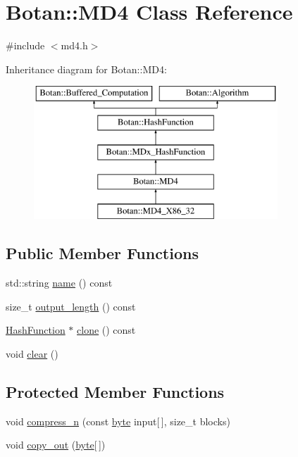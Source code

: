 \hypertarget{classBotan_1_1MD4}{\section{Botan\-:\-:M\-D4 Class Reference}
\label{classBotan_1_1MD4}
}


{\ttfamily \#include $<$md4.\-h$>$}

Inheritance diagram for Botan\-:\-:M\-D4\-:\begin{figure}[H]
\begin{center}
\leavevmode
\includegraphics[height=5.000000cm]{classBotan_1_1MD4}
\end{center}
\end{figure}
\subsection*{Public Member Functions}
\begin{DoxyCompactItemize}
\item 
std\-::string \hyperlink{classBotan_1_1MD4_ad49d2a78c001437c42166c1f60aeaee5}{name} () const 
\item 
size\-\_\-t \hyperlink{classBotan_1_1MD4_a85cd805e6b212e83946e0d92eb9ad68c}{output\-\_\-length} () const 
\item 
\hyperlink{classBotan_1_1HashFunction}{Hash\-Function} $\ast$ \hyperlink{classBotan_1_1MD4_a2d84197fe3b3b547f1e2cd3ecf22c60b}{clone} () const 
\item 
void \hyperlink{classBotan_1_1MD4_a076e596492b7a4cb943ea554128274d7}{clear} ()
\end{DoxyCompactItemize}
\subsection*{Protected Member Functions}
\begin{DoxyCompactItemize}
\item 
void \hyperlink{classBotan_1_1MD4_a243bacd798bd7bffef7ba8064473d78a}{compress\-\_\-n} (const \hyperlink{namespaceBotan_a7d793989d801281df48c6b19616b8b84}{byte} input\mbox{[}$\,$\mbox{]}, size\-\_\-t blocks)
\item 
void \hyperlink{classBotan_1_1MD4_a9241c112ba5e0e1c0a54831846dc0be1}{copy\-\_\-out} (\hyperlink{namespaceBotan_a7d793989d801281df48c6b19616b8b84}{byte}\mbox{[}$\,$\mbox{]})
\end{DoxyCompactItemize}
